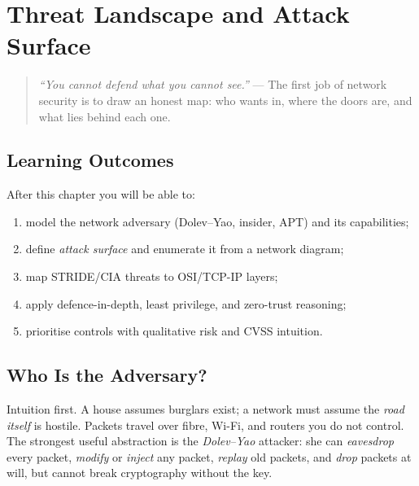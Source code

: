\chapter{Threat Landscape and Attack Surface}\label{ch:threatnet}
\sloppy

\begin{quote}
\emph{``You cannot defend what you cannot see.''} --- The first job of network
security is to draw an honest map: who wants in, where the doors are, and what
lies behind each one.
\end{quote}

\noindent{}
\vspace{0.4em}

\section*{Learning Outcomes}
After this chapter you will be able to:
\begin{enumerate}[label=(L\arabic*)]
    \item model the network adversary (Dolev--Yao, insider, APT) and its capabilities;
    \item define \emph{attack surface} and enumerate it from a network diagram;
    \item map STRIDE/CIA threats to OSI/TCP-IP layers;
    \item apply defence-in-depth, least privilege, and zero-trust reasoning;
    \item prioritise controls with qualitative risk and CVSS intuition.
\end{enumerate}

\section{Who Is the Adversary?}\label{sec:adversary}
Intuition first. A house assumes burglars exist; a network must assume the
\emph{road itself} is hostile. Packets travel over fibre, Wi-Fi, and routers
you do not control. The strongest useful abstraction is the
\emph{Dolev--Yao} attacker: she can \emph{eavesdrop} every packet, \emph{modify}
or \emph{inject} any packet, \emph{replay} old packets, and \emph{drop}
packets at will, but cannot break cryptography without the key.

